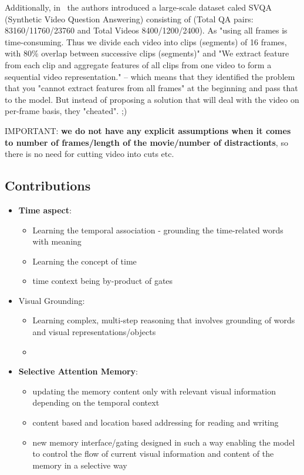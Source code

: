 Additionally, in~\cite{song2018explore} the authors introduced a large-scale dataset caled SVQA (Synthetic Video Question Answering) consisting of (Total QA pairs: 83160/11760/23760 and Total Videos 8400/1200/2400).
As "using all frames is time-consuming. Thus we divide each video into clips (segments) of 16 frames, with 80\% overlap between successive clips (segments)" and "We extract feature from each clip and aggregate features of all clips from one video to form a sequential video representation." -- which means that they identified the problem that you "cannot extract features from all frames" at the beginning and pass that to the model. But instead of proposing a solution that will deal with the video on per-frame basis, they "cheated". ;)

IMPORTANT: \textbf{we do not have any explicit assumptions when it comes to number of frames/length of the movie/number of distractionts}, so there is no need for cutting video into cuts etc.

\subsection{Contributions}

\begin{itemize}
\item \textbf{Time aspect}:
\begin{itemize}
\item Learning the temporal association - grounding the time-related words with meaning
\item Learning the concept of time
\item time context being by-product of gates
\end{itemize}

\item Visual Grounding:
\begin{itemize}
\item Learning complex, multi-step reasoning that involves grounding of words and visual representations/objects
\item 
\end{itemize}
\item \textbf{Selective Attention Memory}:
\begin{itemize}
\item updating the memory content only with relevant visual information depending on the temporal context
\item content based and location based addressing for reading and writing
\item new memory interface/gating designed in such a way enabling the model to control the flow of current visual information and content of the memory in a selective way

\end{itemize}
\end{itemize}







